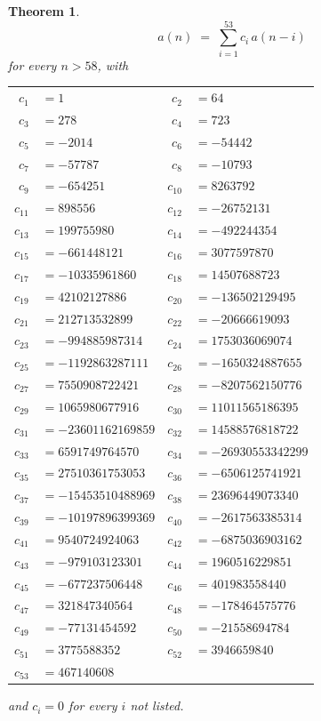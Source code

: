\documentclass[11pt,a4paper]{article}
\theoremstyle{plain}
\newtheorem{theorem}{Theorem}
\theoremstyle{definition}
\begin{document}
\begin{theorem}
\[
a(n)\;=\;\sum_{i=1}^{53}c_i\,a(n-i)
\]
for every $n>58$, with
\begin{center}\footnotesize
\begin{tabular}{r@{\,}l@{\qquad}r@{\,}l}
$c_{1}$ & $=1$ & $c_{2}$ & $=64$ \\
$c_{3}$ & $=278$ & $c_{4}$ & $=723$ \\
$c_{5}$ & $=-2014$ & $c_{6}$ & $=-54442$ \\
$c_{7}$ & $=-57787$ & $c_{8}$ & $=-10793$ \\
$c_{9}$ & $=-654251$ & $c_{10}$ & $=8263792$ \\
$c_{11}$ & $=898556$ & $c_{12}$ & $=-26752131$ \\
$c_{13}$ & $=199755980$ & $c_{14}$ & $=-492244354$ \\
$c_{15}$ & $=-661448121$ & $c_{16}$ & $=3077597870$ \\
$c_{17}$ & $=-10335961860$ & $c_{18}$ & $=14507688723$ \\
$c_{19}$ & $=42102127886$ & $c_{20}$ & $=-136502129495$ \\
$c_{21}$ & $=212713532899$ & $c_{22}$ & $=-20666619093$ \\
$c_{23}$ & $=-994885987314$ & $c_{24}$ & $=1753036069074$ \\
$c_{25}$ & $=-1192863287111$ & $c_{26}$ & $=-1650324887655$ \\
$c_{27}$ & $=7550908722421$ & $c_{28}$ & $=-8207562150776$ \\
$c_{29}$ & $=1065980677916$ & $c_{30}$ & $=11011565186395$ \\
$c_{31}$ & $=-23601162169859$ & $c_{32}$ & $=14588576818722$ \\
$c_{33}$ & $=6591749764570$ & $c_{34}$ & $=-26930553342299$ \\
$c_{35}$ & $=27510361753053$ & $c_{36}$ & $=-6506125741921$ \\
$c_{37}$ & $=-15453510488969$ & $c_{38}$ & $=23696449073340$ \\
$c_{39}$ & $=-10197896399369$ & $c_{40}$ & $=-2617563385314$ \\
$c_{41}$ & $=9540724924063$ & $c_{42}$ & $=-6875036903162$ \\
$c_{43}$ & $=-979103123301$ & $c_{44}$ & $=1960516229851$ \\
$c_{45}$ & $=-677237506448$ & $c_{46}$ & $=401983558440$ \\
$c_{47}$ & $=321847340564$ & $c_{48}$ & $=-178464575776$ \\
$c_{49}$ & $=-77131454592$ & $c_{50}$ & $=-21558694784$ \\
$c_{51}$ & $=3775588352$ & $c_{52}$ & $=3946659840$ \\
$c_{53}$ & $=467140608$ \\
\end{tabular}
\end{center}
and $c_i=0$ for every $i$ not listed.
\end{theorem}
\end{document}
